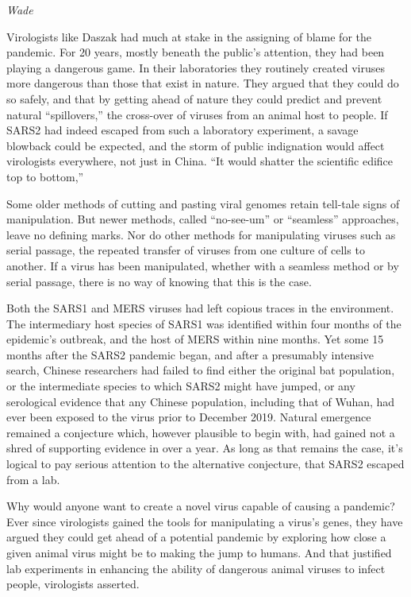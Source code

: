 \documentclass[
]{book}
\begin{document}
\emph{Wade}

Virologists like Daszak had much at stake in the assigning of blame for the pandemic. For 20 years, mostly beneath the public's attention, they had been playing a dangerous game. In their laboratories they routinely created viruses more dangerous than those that exist in nature. They argued that they could do so safely, and that by getting ahead of nature they could predict and prevent natural ``spillovers,'' the cross-over of viruses from an animal host to people. If SARS2 had indeed escaped from such a laboratory experiment, a savage blowback could be expected, and the storm of public indignation would affect virologists everywhere, not just in China. ``It would shatter the scientific edifice top to bottom,''

Some older methods of cutting and pasting viral genomes retain tell-tale signs of manipulation. But newer methods, called ``no-see-um'' or ``seamless'' approaches, leave no defining marks. Nor do other methods for manipulating viruses such as serial passage, the repeated transfer of viruses from one culture of cells to another. If a virus has been manipulated, whether with a seamless method or by serial passage, there is no way of knowing that this is the case.

Both the SARS1 and MERS viruses had left copious traces in the environment. The intermediary host species of SARS1 was identified within four months of the epidemic's outbreak, and the host of MERS within nine months. Yet some 15 months after the SARS2 pandemic began, and after a presumably intensive search, Chinese researchers had failed to find either the original bat population, or the intermediate species to which SARS2 might have jumped, or any serological evidence that any Chinese population, including that of Wuhan, had ever been exposed to the virus prior to December 2019. Natural emergence remained a conjecture which, however plausible to begin with, had gained not a shred of supporting evidence in over a year.
As long as that remains the case, it's logical to pay serious attention to the alternative conjecture, that SARS2 escaped from a lab.

Why would anyone want to create a novel virus capable of causing a pandemic? Ever since virologists gained the tools for manipulating a virus's genes, they have argued they could get ahead of a potential pandemic by exploring how close a given animal virus might be to making the jump to humans. And that justified lab experiments in enhancing the ability of dangerous animal viruses to infect people, virologists asserted.
\end{document}
